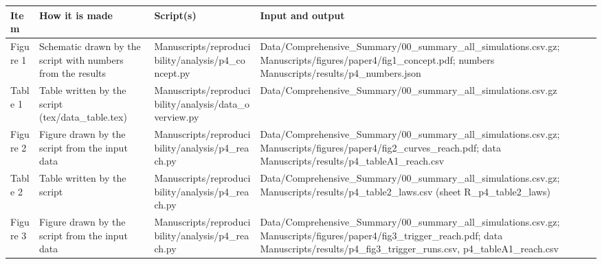 {\scriptsize\begin{longtable}{p{}p{}p{}p{}}\toprule\textbf{Item} & \textbf{How it is made} & \textbf{Script(s)} & \textbf{Input and output}\\\midrule\endhead
{}Figure 1 & Schematic drawn by the script with numbers from the results & Manuscripts/\allowbreak{}reproducibility/\allowbreak{}analysis/\allowbreak{}p4\_\allowbreak{}concept.py & Data/\allowbreak{}Comprehensive\_\allowbreak{}Summary/\allowbreak{}00\_\allowbreak{}summary\_\allowbreak{}all\_\allowbreak{}simulations.csv.gz;  Manuscripts/\allowbreak{}figures/\allowbreak{}paper4/\allowbreak{}fig1\_\allowbreak{}concept.pdf;  numbers Manuscripts/\allowbreak{}results/\allowbreak{}p4\_\allowbreak{}numbers.json\\
{}Table 1 & Table written by the script (tex/data\_table.tex) & Manuscripts/\allowbreak{}reproducibility/\allowbreak{}analysis/\allowbreak{}data\_\allowbreak{}overview.py & Data/\allowbreak{}Comprehensive\_\allowbreak{}Summary/\allowbreak{}00\_\allowbreak{}summary\_\allowbreak{}all\_\allowbreak{}simulations.csv.gz\\
{}Figure 2 & Figure drawn by the script from the input data & Manuscripts/\allowbreak{}reproducibility/\allowbreak{}analysis/\allowbreak{}p4\_\allowbreak{}reach.py & Data/\allowbreak{}Comprehensive\_\allowbreak{}Summary/\allowbreak{}00\_\allowbreak{}summary\_\allowbreak{}all\_\allowbreak{}simulations.csv.gz;  Manuscripts/\allowbreak{}figures/\allowbreak{}paper4/\allowbreak{}fig2\_\allowbreak{}curves\_\allowbreak{}reach.pdf;  data Manuscripts/\allowbreak{}results/\allowbreak{}p4\_\allowbreak{}tableA1\_\allowbreak{}reach.csv\\
{}Table 2 & Table written by the script & Manuscripts/\allowbreak{}reproducibility/\allowbreak{}analysis/\allowbreak{}p4\_\allowbreak{}reach.py & Data/\allowbreak{}Comprehensive\_\allowbreak{}Summary/\allowbreak{}00\_\allowbreak{}summary\_\allowbreak{}all\_\allowbreak{}simulations.csv.gz;  Manuscripts/\allowbreak{}results/\allowbreak{}p4\_\allowbreak{}table2\_\allowbreak{}laws.csv (sheet R\_\allowbreak{}p4\_\allowbreak{}table2\_\allowbreak{}laws)\\
{}Figure 3 & Figure drawn by the script from the input data & Manuscripts/\allowbreak{}reproducibility/\allowbreak{}analysis/\allowbreak{}p4\_\allowbreak{}reach.py & Data/\allowbreak{}Comprehensive\_\allowbreak{}Summary/\allowbreak{}00\_\allowbreak{}summary\_\allowbreak{}all\_\allowbreak{}simulations.csv.gz;  Manuscripts/\allowbreak{}figures/\allowbreak{}paper4/\allowbreak{}fig3\_\allowbreak{}trigger\_\allowbreak{}reach.pdf;  data Manuscripts/\allowbreak{}results/\allowbreak{}p4\_\allowbreak{}fig3\_\allowbreak{}trigger\_\allowbreak{}runs.csv, p4\_\allowbreak{}tableA1\_\allowbreak{}reach.csv\\

\end{longtable}}
